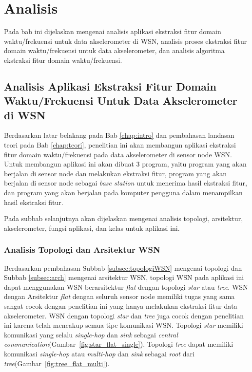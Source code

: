 \chapter{Analisis}
\label{chap:analisis}
Pada bab ini dijelaskan mengenai analisis aplikasi ekstraksi fitur domain waktu/frekuensi untuk data akselerometer di WSN, analisis proses ekstraksi fitur domain waktu/frekuensi untuk data akselerometer, dan analisis algoritma ekstraksi fitur domain waktu/frekuensi.

\section{Analisis Aplikasi Ekstraksi Fitur Domain Waktu/Frekuensi Untuk Data Akselerometer di WSN}
Berdasarkan latar belakang pada Bab \ref{chap:intro} dan pembahasan landasan teori pada Bab \ref{chap:teori}, penelitian ini akan membangun aplikasi ekstraksi fitur domain waktu/frekuensi pada data akselerometer di sensor node WSN. Untuk membangun aplikasi ini akan dibuat 3 program, yaitu program yang akan berjalan di sensor node dan melakukan ekstraksi fitur, program yang akan berjalan di sensor node sebagai {\it base station} untuk menerima hasil ekstraksi fitur, dan program yang akan berjalan pada komputer pengguna dalam menampilkan hasil ekstraksi fitur. 

Pada subbab selanjutnya akan dijelaskan mengenai analisis topologi, arsitektur, akselerometer, fungsi aplikasi, dan kelas untuk aplikasi ini.

\subsection{Analisis Topologi dan Arsitektur WSN} \label{subsec:analisisTopArs}
Berdasarkan pembahasan Subbab \ref{subsec:topologiWSN} mengenai topologi dan Subbab \ref{subsec:arch} mengenai arsitektur WSN, topologi WSN pada aplikasi ini dapat menggunakan WSN berarsitektur {\it flat} dengan topologi {\it star} atau {\it tree}. WSN dengan Arsitektur {\it flat} dengan seluruh sensor node memiliki tugas yang sama sangat cocok dengan penelitian ini yang hanya melakukan ekstraksi fitur data akselerometer. WSN dengan topologi {\it star} dan {\it tree} juga cocok dengan penelitian ini karena telah mencakup semua tipe komunikasi WSN. Topologi {\it star} memiliki komunikasi yang selalu {\it single-hop} dan {\it sink} sebagai {\it central communication}(Gambar~\ref{fig:star_flat_single}). Topologi {\it tree} dapat memiliki komunikasi {\it single-hop} atau {\it multi-hop} dan {\it sink} sebagai {\it root} dari {\it tree}(Gambar~\ref{fig:tree_flat_multi}).    

